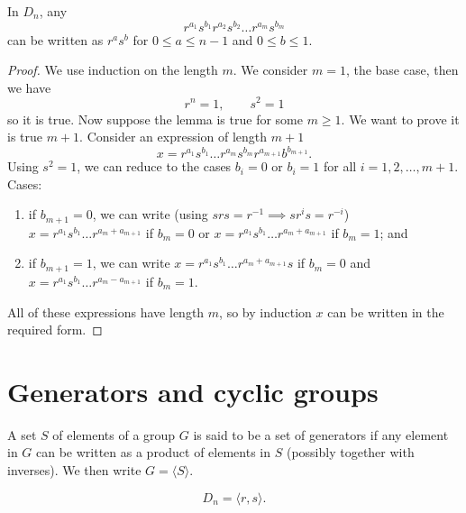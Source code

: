 
\begin{lemma}[]
    In $D_n$, any
    \[
        r^{a_1}s^{b_1}r^{a_2}s^{b_2}\ldots r^{a_m}s^{b_m}
    \]
    can be written as $r^as^b$ for
    $0 \leq a \leq n - 1$ and $0 \leq b \leq 1$.
\end{lemma}

\begin{proof}
    We use induction on the length $m$.
    We consider $m = 1$, the base case, then we have
    \[
        r^n = 1, \qquad s^2 = 1
    \]
    so it is true.
    Now suppose the lemma is true for some $m \geq 1$.
    We want to prove it is true $m + 1$.
    Consider an expression of length $m + 1$
    \[
        x = r^{a_1}s^{b_1}\ldots r^{a_m}s^{b_m}r^{a_{m+1}}b^{b_{m+1}}.
    \]
    Using $s^2 = 1$, we can reduce to the cases $b_i = 0$ or $b_i = 1$
    for all $i = 1, 2, \ldots, m+1$.
    Cases:
    \begin{enumerate}
        \item 
            if $b_{m+1} = 0$, we can write
            (using $srs = r^{-1} \implies sr^is = r^{-i}$)
            $x = r^{a_1}s^{b_1}\ldots r^{a_m+a_{m+1}}$
            if $b_m = 0$ or
            $x = r^{a_1}s^{b_1}\ldots r^{a_m+a_{m+1}}$
            if $b_m = 1$; and

        \item
            if $b_{m + 1} = 1$, we can write
            $x = r^{a_1}s^{b_1}\ldots r^{a_m+a_{m+1}}s$
            if $b_m = 0$ and
            $x = r^{a_1}s^{b_1}\ldots r^{a_m-a_{m+1}}$
            if $b_m = 1$.
    \end{enumerate}
    All of these expressions have length $m$,
    so by induction $x$ can be written in the required form.
\end{proof}

\chapter{Generators and cyclic groups}

\begin{definition}[]
    A set $S$ of elements of a group $G$ is said to be a set of
    generators if any element in $G$ can be written as a product
    of elements in $S$ (possibly together with inverses).
    We then write $G = \langle S \rangle$.
\end{definition}

\begin{example}
    \[
        D_n = \langle r, s \rangle.
    \]
\end{example}

